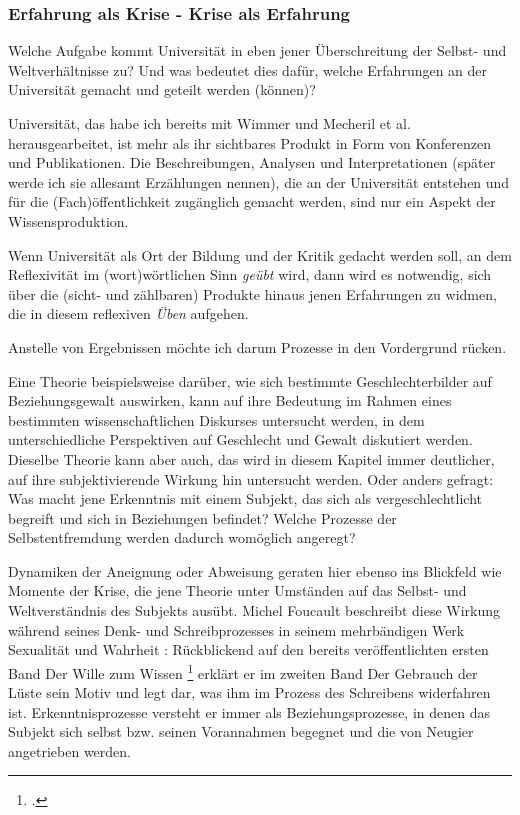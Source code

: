 \subsubsection{Erfahrung als Krise - Krise als Erfahrung}

Welche Aufgabe kommt Universität in eben jener Überschreitung der Selbst- und
Weltverhältnisse zu? Und was bedeutet dies dafür, welche Erfahrungen an der
Universität gemacht und geteilt werden (können)? 

Universität, das habe ich
bereits mit Wimmer und Mecheril et al. herausgearbeitet, ist mehr als ihr
sichtbares Produkt in Form von Konferenzen und Publikationen. Die
Beschreibungen, Analysen und Interpretationen (später werde ich sie allesamt
Erzählungen nennen), die an der Universität entstehen und für die
(Fach)öffentlichkeit zugänglich gemacht werden, sind nur ein Aspekt der
Wissensproduktion. 

Wenn Universität als Ort der Bildung und der Kritik gedacht
werden soll, an dem Reflexivität im (wort)wörtlichen Sinn \textit{geübt} wird, dann wird
es notwendig, sich über die (sicht- und zählbaren) Produkte hinaus jenen
Erfahrungen zu widmen, die in diesem reflexiven \textit{Üben} aufgehen.  

Anstelle von
Ergebnissen möchte ich darum Prozesse in den Vordergrund rücken.  

Eine Theorie
beispielsweise darüber, wie sich bestimmte Geschlechterbilder auf
Beziehungsgewalt auswirken, kann auf ihre Bedeutung im Rahmen eines bestimmten
wissenschaftlichen Diskurses untersucht werden, in dem unterschiedliche
Perspektiven auf Geschlecht und Gewalt diskutiert werden. Dieselbe Theorie kann
aber auch, das wird in diesem Kapitel immer deutlicher, auf ihre
subjektivierende Wirkung hin untersucht werden. Oder anders gefragt:\\
Was macht
jene Erkenntnis mit einem Subjekt, das sich als vergeschlechtlicht begreift und
sich in Beziehungen befindet? Welche Prozesse der Selbstentfremdung werden
dadurch womöglich angeregt?  

Dynamiken der Aneignung oder Abweisung geraten
hier ebenso ins Blickfeld wie Momente der Krise, die jene Theorie unter
Umständen auf das Selbst- und Weltverständnis des Subjekts ausübt.  Michel
Foucault beschreibt diese Wirkung während seines Denk- und Schreibprozesses in
seinem mehrbändigen Werk \glqq Sexualität und Wahrheit \grqq \footnotemark
{}: Rückblickend auf den
bereits veröffentlichten ersten Band \glqq Der Wille zum Wissen \grqq
\footnotemark \footcitetext{foucault} erklärt er im
zweiten Band \glqq Der Gebrauch der Lüste \grqq \footnotemark
{} sein Motiv und legt dar, was ihm im
Prozess des Schreibens widerfahren ist. Erkenntnisprozesse versteht er immer als Beziehungsprozesse, in denen das Subjekt sich selbst bzw. seinen Vorannahmen begegnet und die von Neugier angetrieben werden. 

